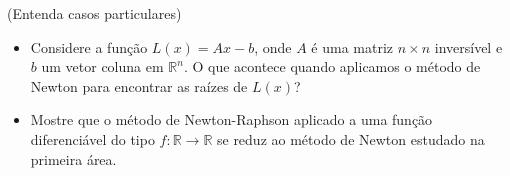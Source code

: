 \begin{exer}(Entenda casos particulares)
\begin{itemize}
\item Considere a função $L(x)=Ax-b$, onde $A$ é uma matriz $n\times n$ inversível e $b$ um vetor coluna em $\mathbb{R}^n$. O que acontece quando aplicamos o método de Newton para encontrar as raízes de $L(x)$?
\item Mostre que o método de Newton-Raphson aplicado a uma função diferenciável do tipo $f:\mathbb{R}\to\mathbb{R}$ se reduz ao método de Newton estudado na primeira área.
\end{itemize}
\end{exer}
\begin{resp}
  \construirResp
\end{resp}

